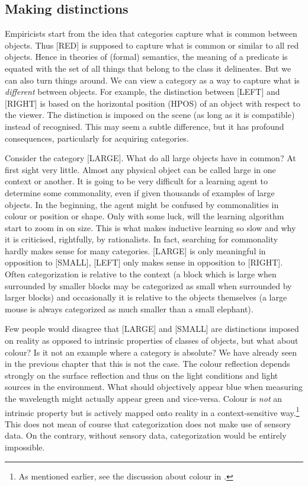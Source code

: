 \subsection{Making distinctions}

Empiricists start from the idea that categories 
capture what is common
between objects. Thus [RED] is supposed to capture 
what is common or similar to all 
red objects. Hence in theories of 
(formal) semantics, the meaning of a predicate is 
equated with the set of all things that 
belong to the class it delineates. 
But we can also turn things around. We can 
view a category as a way to capture what is {\it different} 
between objects. For example, the distinction between 
[LEFT] and [RIGHT] is based on the horizontal position (HPOS)
of an object with respect to the viewer. 
The distinction is imposed on the scene (as long as 
it is compatible) instead of 
recognised. This may seem a subtle difference, but it
has profound consequences, particularly for acquiring
categories.

Consider the category [LARGE]. What do all large 
objects have in common? At first sight very little. 
Almost any physical object can be called large in 
one context or another. 
It is going to be very difficult for a learning agent
to determine some commonality, even if given thousands 
of examples of large objects. In the beginning, the agent
might be confused by commonalities in 
colour or position or shape. 
Only with some luck, will the learning algorithm
start to zoom in on size. 
This is what makes inductive learning so slow and 
why it is criticised, rightfully, by rationalists. 
In fact, searching for commonality hardly makes sense for
many categories. [LARGE] is only meaningful in
opposition to [SMALL], [LEFT] only makes sense
in opposition to [RIGHT]. Often categorization
is relative to the context (a block which is large when surrounded
by smaller blocks may be categorized as
small when surrounded by larger
blocks) and occasionally it is relative to the objects themselves
(a large mouse is always categorized as
much smaller than a small elephant). 

Few people would disagree that [LARGE] and [SMALL] are
distinctions imposed on reality as opposed to intrinsic
properties of classes of objects, but what about colour? Is it
not an example where a category is absolute? We have 
already seen in the previous chapter that this is not 
the case. The colour reflection depends strongly on the 
surface reflection and thus on the light conditions and
light sources in the environment. What should objectively 
appear blue when measuring the wavelength might actually 
appear green and vice-versa. Colour is {\it not}
an intrinsic property but is actively mapped onto reality
in a context-sensitive way.\footnote{
As mentioned earlier, see the discussion about colour 
in \cite{Varela:1991}.}
This does not mean of course that categorization does not make use of sensory
data. On the contrary, without sensory data, categorization
would be entirely impossible. 


